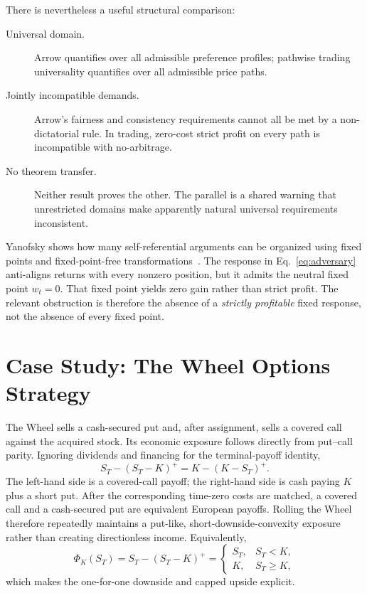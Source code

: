 \documentclass[aps,pra,reprint,superscriptaddress,amsmath,amssymb,floatfix]{revtex4-2}
\theoremstyle{plain}
\theoremstyle{definition}
\theoremstyle{remark}
\begin{document}
There is nevertheless a useful structural comparison:
\begin{description}
  \item[Universal domain.] Arrow quantifies over all admissible preference
  profiles; pathwise trading universality quantifies over all admissible price
  paths.
  \item[Jointly incompatible demands.] Arrow's fairness and consistency
  requirements cannot all be met by a non-dictatorial rule. In trading,
  zero-cost strict profit on every path is incompatible with no-arbitrage.
  \item[No theorem transfer.] Neither result proves the other. The parallel is
  a shared warning that unrestricted domains make apparently natural
  universal requirements inconsistent.
\end{description}

Yanofsky shows how many self-referential arguments can be organized using
fixed points and fixed-point-free transformations~\cite{Yanofsky-BSL:9051621}.
The response in Eq.~\eqref{eq:adversary} anti-aligns returns with every
nonzero position, but it admits the neutral fixed point \(w_t=0\). That fixed
point yields zero gain rather than strict profit. The relevant obstruction is
therefore the absence of a \emph{strictly profitable} fixed response, not the
absence of every fixed point.

\section{Case Study: The Wheel Options Strategy}
\label{sec:wheel}

The Wheel sells a cash-secured put and, after assignment, sells a covered call
against the acquired stock. Its economic exposure follows directly from
put--call parity. Ignoring dividends and financing for the terminal-payoff
identity,
\begin{equation}
  S_T-(S_T-K)^+
  =K-(K-S_T)^+.
  \label{eq:putcall}
\end{equation}
The left-hand side is a covered-call payoff; the right-hand side is cash
paying \(K\) plus a short put. After the corresponding time-zero costs are
matched, a covered call and a cash-secured put are equivalent European
payoffs. Rolling the Wheel therefore repeatedly maintains a put-like,
short-downside-convexity exposure rather than creating directionless income.
Equivalently,
\begin{equation}
  \Phi_K(S_T)
  =S_T-(S_T-K)^+
  =
  \begin{cases}
    S_T,&S_T<K,\\
    K,&S_T\geq K,
  \end{cases}
  \label{eq:wheelpiecewise}
\end{equation}
which makes the one-for-one downside and capped upside explicit.
\end{document}
